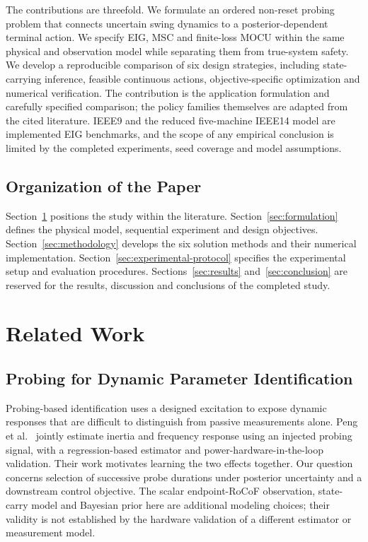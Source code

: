\documentclass[journal]{IEEEtran}
\begin{document}
The contributions are threefold. We formulate an ordered non-reset probing
problem that connects uncertain swing dynamics to a posterior-dependent
terminal action. We specify EIG, MSC and finite-loss MOCU within the same
physical and observation model while separating them from true-system safety.
We develop a reproducible comparison of six design strategies, including
state-carrying inference, feasible continuous actions, objective-specific
optimization and numerical verification. The contribution is the application
formulation and carefully specified comparison; the policy families themselves
are adapted from the cited literature. IEEE9 and the reduced five-machine IEEE14 model are implemented EIG benchmarks,
and the scope of any empirical conclusion is limited by the completed
experiments, seed coverage and model assumptions.

\subsection{Organization of the Paper}
Section~\ref{sec:related-work} positions the study within the literature.
Section~\ref{sec:formulation} defines the physical model, sequential experiment
and design objectives. Section~\ref{sec:methodology} develops the six solution
methods and their numerical implementation. Section~\ref{sec:experimental-protocol}
specifies the experimental setup and evaluation procedures.
Sections~\ref{sec:results} and~\ref{sec:conclusion} are reserved for the results,
discussion and conclusions of the completed study.

\section{Related Work}
\label{sec:related-work}
\subsection{Probing for Dynamic Parameter Identification}
Probing-based identification uses a designed excitation to expose dynamic
responses that are difficult to distinguish from passive measurements alone.
Peng et al.~\cite{peng2024probing} jointly estimate inertia and frequency
response using an injected probing signal, with a regression-based estimator
and power-hardware-in-the-loop validation. Their work motivates learning the
two effects together. Our question concerns selection of successive probe
durations under posterior uncertainty and a downstream control objective.
The scalar endpoint-RoCoF observation, state-carry model and Bayesian prior here
are additional modeling choices; their validity is not established by the
hardware validation of a different estimator or measurement model.
\end{document}
